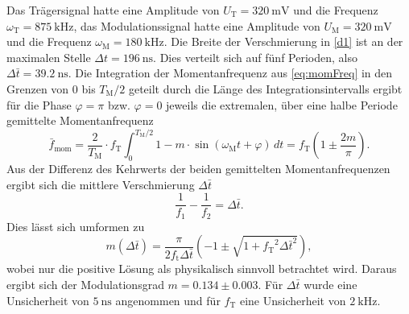 Das Trägersignal hatte eine Amplitude von $U_\text{T}=\SI{320}{\milli\volt}$ und die Frequenz $\omega_\text{T}=\SI{875}{\kilo\hertz}$, das Modulationssignal hatte eine Amplitude von $U_\text{M}=\SI{320}{\milli\volt}$ und die Frequenz $\omega_\text{M}=\SI{180}{\kilo\hertz}$. Die Breite der Verschmierung in \autoref{d1} ist an der maximalen Stelle $\Delta t = \SI{196}{\nano\second}$. Dies verteilt sich auf fünf Perioden, also $\Delta \bar{t} = \SI{39.2}{\nano\second}$.
Die Integration der Momentanfrequenz aus \autoref{eq:momFreq} in den Grenzen von $0$ bis $T_\text{M}/2$ geteilt durch die Länge des Integrationsintervalls ergibt für die Phase $\varphi = \pi$ bzw. $\varphi = 0$ jeweils die extremalen, über eine halbe Periode gemittelte Momentanfrequenz
\[
	\bar{f}_\text{mom} = \frac{2}{T_\text{M}} \cdot f_\text{T}\int_0^{T_\text{M}/2} 1 - m \cdot \sin (\omega_\text{M} t + \varphi) \,dt = f_\text{T}\left( 1 \pm \frac{2m}{\pi} \right).
\]
Aus der Differenz des Kehrwerts der beiden gemittelten Momentanfrequenzen ergibt sich die mittlere Verschmierung $\Delta \bar{t}$
\[
	\frac{1}{f_1} - \frac{1}{f_2} = \Delta \bar{t}.
\]
Dies lässt sich umformen zu
\[
	m(\Delta \bar{t}) = \frac{\pi}{2f_\text{t}\Delta \bar{t}} \left( -1 \pm \sqrt{ 1 + {f_\text{T}}^2 \Delta \bar{t}^2} \right),
\]
wobei nur die positive Lösung als physikalisch sinnvoll betrachtet wird. Daraus ergibt sich der Modulationsgrad $m = 0.134 \pm 0.003$. Für $\Delta \bar{t}$ wurde eine Unsicherheit von $\SI{5}{\nano\second}$ angenommen und für $f_\text{T}$ eine Unsicherheit von $\SI{2}{\kilo\hertz}$.

